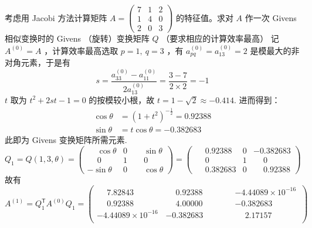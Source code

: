 \documentclass[11pt]{article}
\begin{document}
\begin{question}
    \questiontext
    {
        考虑用 Jacobi 方法计算矩阵 $A = \begin{pmatrix}
                7 & 1 & 2 \\
                1 & 4 & 0 \\
                2 & 0 & 3
            \end{pmatrix}$ 的特征值。求对 $A$ 作一次 Givens 相似变换时的 Givens （旋转）变换矩阵 $Q$ （要求相应的计算效率最高）
    }
    \answer
    {
        记 $A^{(0)} = A$ ，计算效率最高选取 $p = 1,\ q = 3$ ，有 $a^{(0)}_{pq} = a^{(0)}_{13} = 2$ 是模最大的非对角元素，于是有
        $$
            s = \frac{a^{(0)}_{33} - a^{(0)}_{11}}{2a^{(0)}_{13}} = \frac{3 - 7}{2 \times 2} = -1
        $$
        $t$ 取为 $t^2 + 2st - 1 = 0$ 的按模较小根，故 $t = 1 - \sqrt{2} \approx -0.414$. 进而得到：
        \begin{align*}
            \cos\theta & = \left(1 + t^2\right)^{-\frac{1}{2}} = 0.92388 \\
            \sin\theta & = t \cos\theta = -0.382683
        \end{align*}
        此即为 Givens 变换矩阵所需元素.
        \begin{equation*}
            Q_1 = Q(1, 3, \theta) = \begin{pmatrix}
                \phantom{-}\cos\theta & 0 & \phantom{-}\sin\theta \\
                \phantom{-}0          & 1 & \phantom{-}0          \\
                -\sin\theta           & 0 & \phantom{-}\cos\theta
            \end{pmatrix} = \begin{pmatrix}
                \phantom{-}0.92388  & 0 & -0.382683          \\
                \phantom{-}0        & 1 & \phantom{-}0       \\
                \phantom{-}0.382683 & 0 & \phantom{-}0.92388
            \end{pmatrix}
        \end{equation*}
        故有
        \begin{equation*}
            A^{(1)} = Q_1^{\mathsf{T}}A^{(0)}Q_1 =
            \begin{pmatrix}
                \phantom{-}7.82843\phantom{ \times 10 ^{-16}} & \phantom{-}0.92388\phantom{ \times 10 ^{-16}} & -4.44089 \times 10 ^{-16}                     \\
                \phantom{-}0.92388\phantom{ \times 10 ^{-16}} & \phantom{-}4.00000\phantom{ \times 10 ^{-16}} & -0.382683\phantom{ \times 10 ^{-16}}          \\
                -4.44089 \times 10 ^{-16}                     & -0.382683\phantom{ \times 10 ^{-16}}          & \phantom{-}2.17157\phantom{ \times 10 ^{-16}} \\
            \end{pmatrix}
        \end{equation*}
    }
\end{question}
\end{document}
